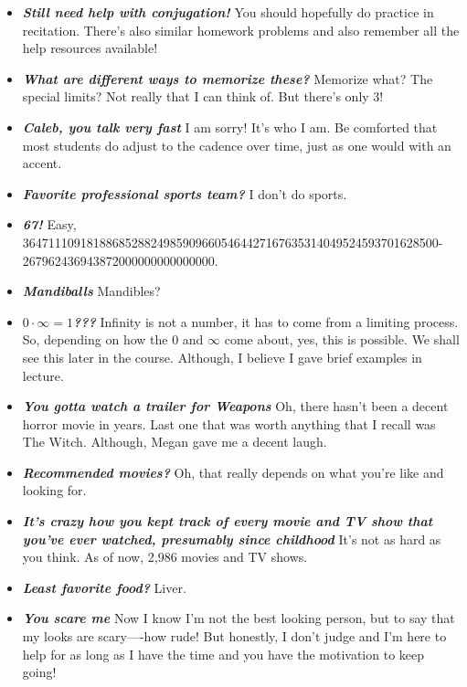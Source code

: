 \documentclass[11pt,letterpaper]{article}
\begin{document}
\begin{itemize}
\item {\bfseries\itshape Still need help with conjugation!} You should hopefully do practice in recitation. There's also similar homework problems and also remember all the help resources available! 

\item {\bfseries\itshape What are different ways to memorize these?} Memorize what? The special limits? Not really that I can think of. But there's only 3!

\item {\bfseries\itshape Caleb, you talk very fast} I am sorry! It's who I am. Be comforted that most students do adjust to the cadence over time, just as one would with an accent. 

\item {\bfseries\itshape Favorite professional sports team?} I don't do sports. 

\item {\bfseries\itshape 67!} Easy, 36471110918188685288249859096605464427167635314049524593701628500- 267962436943872000000000000000.

\item {\bfseries\itshape Mandiballs} Mandibles?

\item {\bfseries\itshape $0 \cdot \infty= 1$???} Infinity is not a number, it has to come from a limiting process. So, depending on how the 0 and $\infty$ come about, yes, this is possible. We shall see this later in the course. Although, I believe I gave brief examples in lecture. 

\item {\bfseries\itshape You gotta watch a trailer for Weapons} Oh, there hasn't been a decent horror movie in years. Last one that was worth anything that I recall was The Witch. Although, Megan gave me a decent laugh. 

\item {\bfseries\itshape Recommended movies?} Oh, that really depends on what you're like and looking for. 

\item {\bfseries\itshape It's crazy how you kept track of every movie and TV show that you've ever watched, presumably since childhood} It's not as hard as you think. As of now, 2,986 movies and TV shows.

\item {\bfseries\itshape Least favorite food?} Liver.

\item {\bfseries\itshape You scare me} Now I know I'm not the best looking person, but to say that my looks are scary----how rude! But honestly, I don't judge and I'm here to help for as long as I have the time and you have the motivation to keep going!


\end{itemize}
\end{document}

